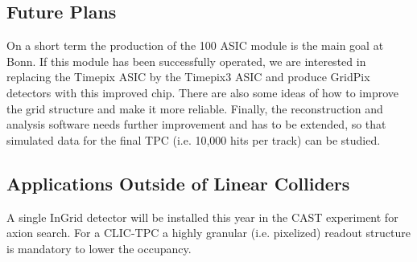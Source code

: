 \subsection{Future Plans}
On a short term the production of the 100 ASIC module is the main goal at Bonn. If this module has been successfully operated, we are interested in replacing the Timepix ASIC by the Timepix3 ASIC and produce GridPix detectors with this improved chip. There are also some ideas of how to improve the grid structure and make it more reliable. Finally, the reconstruction and analysis software needs further improvement and has to be extended, so that simulated data for the final TPC (i.e. 10,000 hits per track) can be studied.

\subsection{Applications Outside of Linear Colliders}
A single InGrid detector will be installed this year in the CAST experiment for axion search. For a CLIC-TPC a highly granular (i.e. pixelized) readout structure is mandatory to lower the occupancy.
